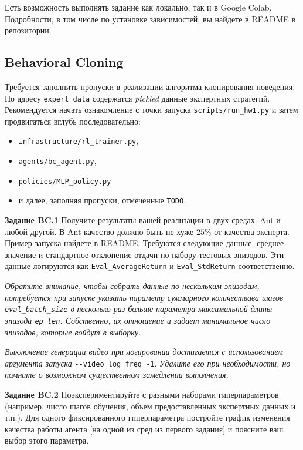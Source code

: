 \documentclass[12pt, oneside]{article}
\begin{document}
Есть возможность выполнять задание как локально, так и в Google Colab. Подробности, в том числе по установке зависимостей, вы найдете в README в репозитории.

\subsection{Behavioral Cloning}

Требуется заполнить пропуски в реализации алгоритма клонирования поведения. По адресу \verb|expert_data| содержатся \textit{pickled} данные экспертных стратегий. Рекомендуется начать ознакомление с точки запуска \verb|scripts/run_hw1.py| и затем продвигаться вглубь последовательно:

\begin{itemize}
    \item \verb|infrastructure/rl_trainer.py|,
    \item \verb|agents/bc_agent.py|,
    \item \verb|policies/MLP_policy.py|
    \item и далее, заполняя пропуски, отмеченные \verb|TODO|.
\end{itemize}

\textbf{Задание BC.1} Получите результаты вашей реализации в двух средах: Ant и любой другой. В Ant качество должно быть не хуже $25\%$ от качества эксперта. Пример запуска найдете в README. Требуются следующие данные: среднее значение и стандартное отклонение отдачи по набору тестовых эпизодов. Эти данные логируются как \verb|Eval_AverageReturn| и \verb|Eval_StdReturn| соответственно.

\textit{Обратите внимание, чтобы собрать данные по нескольким эпизодам, потребуется при запуске указать параметр суммарного количествава шагов \texttt{eval\_batch\_size} в несколько раз больше параметра максимальной длины эпизода \texttt{ep\_len}. Собственно, их отношение и задает минимальное число эпизодов, которые войдут в выборку.}

\textit{Выключение генерации видео при логировании достигается с использованием аргумента запуска} \verb|--video_log_freq -1|. \textit{Удалите его при необходимости, но помните о возможном существенном замедлении выполнения.}

\textbf{Задание BC.2} Поэкспериментируйте с разными наборами гиперпараметров (например, число шагов обучения, объем предоставленных экспертных данных и т.п.). Для одного фиксированного гиперпараметра постройте график изменения качества работы агента [на одной из сред из первого задания] и поясните ваш выбор этого параметра.
\end{document}
